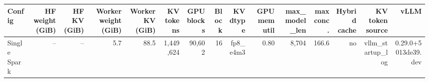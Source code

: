 \begin{tabular}{l r r r r r r r r r r r r r r }
\toprule
Config & HF weight (GiB) & HF KV (GiB) & Worker weight (GiB) & Worker KV (GiB) & KV tokens & GPU blocks & Block & KV dtype & GPU mem util & max\_model\_len & max conc. & Hybrid cache & KV token source & vLLM \\
\midrule
Single Spark & -- & -- & 5.7 & 88.5 & 1,449,624 & 90,602 & 16 & fp8\_e4m3 & 0.80 & 8,704 & 166.6 & no & vllm\_startup\_log & 0.29.0+5013de39.dev \\
\bottomrule
\end{tabular}
